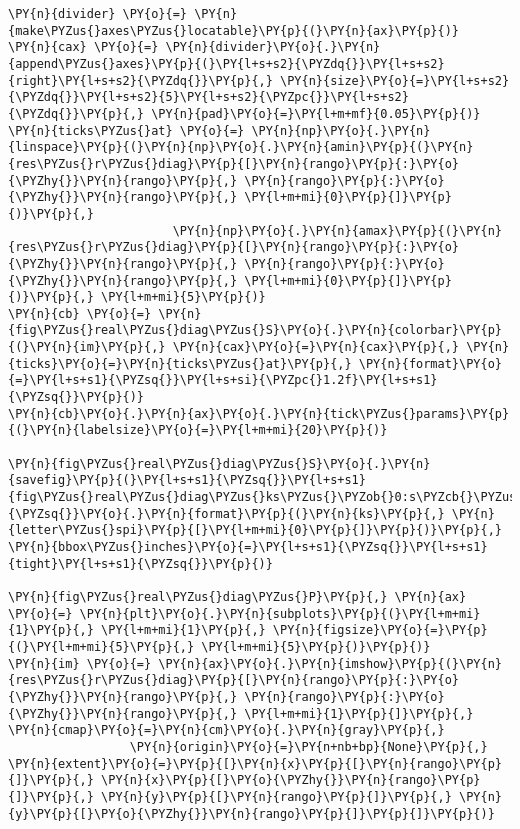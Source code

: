 \begin{Verbatim}[commandchars=\\\{\}]
\PY{n}{divider} \PY{o}{=} \PY{n}{make\PYZus{}axes\PYZus{}locatable}\PY{p}{(}\PY{n}{ax}\PY{p}{)}
\PY{n}{cax} \PY{o}{=} \PY{n}{divider}\PY{o}{.}\PY{n}{append\PYZus{}axes}\PY{p}{(}\PY{l+s+s2}{\PYZdq{}}\PY{l+s+s2}{right}\PY{l+s+s2}{\PYZdq{}}\PY{p}{,} \PY{n}{size}\PY{o}{=}\PY{l+s+s2}{\PYZdq{}}\PY{l+s+s2}{5}\PY{l+s+s2}{\PYZpc{}}\PY{l+s+s2}{\PYZdq{}}\PY{p}{,} \PY{n}{pad}\PY{o}{=}\PY{l+m+mf}{0.05}\PY{p}{)}
\PY{n}{ticks\PYZus{}at} \PY{o}{=} \PY{n}{np}\PY{o}{.}\PY{n}{linspace}\PY{p}{(}\PY{n}{np}\PY{o}{.}\PY{n}{amin}\PY{p}{(}\PY{n}{res\PYZus{}r\PYZus{}diag}\PY{p}{[}\PY{n}{rango}\PY{p}{:}\PY{o}{\PYZhy{}}\PY{n}{rango}\PY{p}{,} \PY{n}{rango}\PY{p}{:}\PY{o}{\PYZhy{}}\PY{n}{rango}\PY{p}{,} \PY{l+m+mi}{0}\PY{p}{]}\PY{p}{)}\PY{p}{,}
                       \PY{n}{np}\PY{o}{.}\PY{n}{amax}\PY{p}{(}\PY{n}{res\PYZus{}r\PYZus{}diag}\PY{p}{[}\PY{n}{rango}\PY{p}{:}\PY{o}{\PYZhy{}}\PY{n}{rango}\PY{p}{,} \PY{n}{rango}\PY{p}{:}\PY{o}{\PYZhy{}}\PY{n}{rango}\PY{p}{,} \PY{l+m+mi}{0}\PY{p}{]}\PY{p}{)}\PY{p}{,} \PY{l+m+mi}{5}\PY{p}{)} 
\PY{n}{cb} \PY{o}{=} \PY{n}{fig\PYZus{}real\PYZus{}diag\PYZus{}S}\PY{o}{.}\PY{n}{colorbar}\PY{p}{(}\PY{n}{im}\PY{p}{,} \PY{n}{cax}\PY{o}{=}\PY{n}{cax}\PY{p}{,} \PY{n}{ticks}\PY{o}{=}\PY{n}{ticks\PYZus{}at}\PY{p}{,} \PY{n}{format}\PY{o}{=}\PY{l+s+s1}{\PYZsq{}}\PY{l+s+si}{\PYZpc{}1.2f}\PY{l+s+s1}{\PYZsq{}}\PY{p}{)}
\PY{n}{cb}\PY{o}{.}\PY{n}{ax}\PY{o}{.}\PY{n}{tick\PYZus{}params}\PY{p}{(}\PY{n}{labelsize}\PY{o}{=}\PY{l+m+mi}{20}\PY{p}{)}

\PY{n}{fig\PYZus{}real\PYZus{}diag\PYZus{}S}\PY{o}{.}\PY{n}{savefig}\PY{p}{(}\PY{l+s+s1}{\PYZsq{}}\PY{l+s+s1}{fig\PYZus{}real\PYZus{}diag\PYZus{}ks\PYZus{}\PYZob{}0:s\PYZcb{}\PYZus{}\PYZob{}1:s\PYZcb{}}\PY{l+s+s1}{\PYZsq{}}\PY{o}{.}\PY{n}{format}\PY{p}{(}\PY{n}{ks}\PY{p}{,} \PY{n}{letter\PYZus{}spi}\PY{p}{[}\PY{l+m+mi}{0}\PY{p}{]}\PY{p}{)}\PY{p}{,} \PY{n}{bbox\PYZus{}inches}\PY{o}{=}\PY{l+s+s1}{\PYZsq{}}\PY{l+s+s1}{tight}\PY{l+s+s1}{\PYZsq{}}\PY{p}{)}

\PY{n}{fig\PYZus{}real\PYZus{}diag\PYZus{}P}\PY{p}{,} \PY{n}{ax} \PY{o}{=} \PY{n}{plt}\PY{o}{.}\PY{n}{subplots}\PY{p}{(}\PY{l+m+mi}{1}\PY{p}{,} \PY{l+m+mi}{1}\PY{p}{,} \PY{n}{figsize}\PY{o}{=}\PY{p}{(}\PY{l+m+mi}{5}\PY{p}{,} \PY{l+m+mi}{5}\PY{p}{)}\PY{p}{)}
\PY{n}{im} \PY{o}{=} \PY{n}{ax}\PY{o}{.}\PY{n}{imshow}\PY{p}{(}\PY{n}{res\PYZus{}r\PYZus{}diag}\PY{p}{[}\PY{n}{rango}\PY{p}{:}\PY{o}{\PYZhy{}}\PY{n}{rango}\PY{p}{,} \PY{n}{rango}\PY{p}{:}\PY{o}{\PYZhy{}}\PY{n}{rango}\PY{p}{,} \PY{l+m+mi}{1}\PY{p}{]}\PY{p}{,} \PY{n}{cmap}\PY{o}{=}\PY{n}{cm}\PY{o}{.}\PY{n}{gray}\PY{p}{,}
                 \PY{n}{origin}\PY{o}{=}\PY{n+nb+bp}{None}\PY{p}{,} \PY{n}{extent}\PY{o}{=}\PY{p}{[}\PY{n}{x}\PY{p}{[}\PY{n}{rango}\PY{p}{]}\PY{p}{,} \PY{n}{x}\PY{p}{[}\PY{o}{\PYZhy{}}\PY{n}{rango}\PY{p}{]}\PY{p}{,} \PY{n}{y}\PY{p}{[}\PY{n}{rango}\PY{p}{]}\PY{p}{,} \PY{n}{y}\PY{p}{[}\PY{o}{\PYZhy{}}\PY{n}{rango}\PY{p}{]}\PY{p}{]}\PY{p}{)}


\end{Verbatim}
